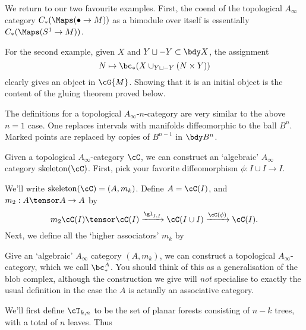 We return to our two favourite examples. First, the coend of the topological $A_\infty$ category $C_*(\Maps(\bullet \to M))$ as a bimodule over itself
is essentially $C_*(\Maps(S^1 \to M))$. \todo{}

For the second example, given $X$ and $Y\du -Y \sub \bdy X$, the assignment
$$N \mapsto \bc_*(X \cup_{Y\du -Y} (N\times Y))$$ clearly gives an object in $\cG{M}$.
Showing that it is an initial object is the content of the gluing theorem proved below.

The definitions for a topological $A_\infty$-$n$-category are very similar to the above
$n=1$ case.
One replaces intervals with manifolds diffeomorphic to the ball $B^n$.
Marked points are replaced by copies of $B^{n-1}$ in $\bdy B^n$.





\newcommand{\skel}[1]{\operatorname{skeleton}(#1)}

Given a topological $A_\infty$-category $\cC$, we can construct an `algebraic' $A_\infty$ category $\skel{\cC}$. First, pick your
favorite diffeomorphism $\phi: I \cup I \to I$.
\begin{defn}
We'll write $\skel{\cC} = (A, m_k)$. Define $A = \cC(I)$, and $m_2 : A \tensor A \to A$ by
\begin{equation*}
m_2 \cC(I) \tensor \cC(I) \xrightarrow{\gl_{I,I}} \cC(I \cup I) \xrightarrow{\cC(\phi)} \cC(I).
\end{equation*}
Next, we define all the `higher associators' $m_k$ by
\todo{}
\end{defn}

Give an `algebraic' $A_\infty$ category $(A, m_k)$, we can construct a topological $A_\infty$-category, which we call $\bc_*^A$. You should
think of this as a generalisation of the blob complex, although the construction we give will \emph{not} specialise to exactly the usual definition
in the case the $A$ is actually an associative category.

We'll first define $\cT_{k,n}$ to be the set of planar forests consisting of $n-k$ trees, with a total of $n$ leaves. Thus
\begin{align*}
\end{align*}

